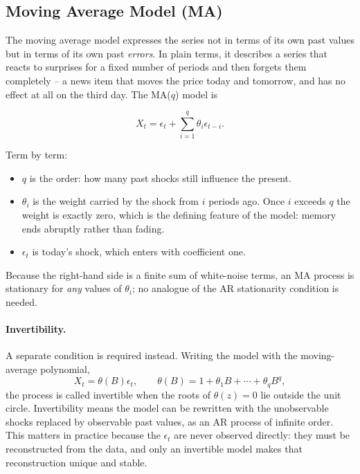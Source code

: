 \documentclass[12pt,a4paper]{article}
\begin{document}
\subsection{Moving Average Model (MA)}

The moving average model expresses the series not in terms of its own past
values but in terms of its own past \emph{errors}. In plain terms, it
describes a series that reacts to surprises for a fixed number of periods and
then forgets them completely -- a news item that moves the price today and
tomorrow, and has no effect at all on the third day. The MA($q$) model is

\begin{equation}
X_t = \epsilon_t + \sum_{i=1}^{q}\theta_i \epsilon_{t-i}.
\end{equation}

Term by term:
\begin{itemize}
\item $q$ is the order: how many past shocks still influence the present.
\item $\theta_i$ is the weight carried by the shock from $i$ periods ago. Once
      $i$ exceeds $q$ the weight is exactly zero, which is the defining
      feature of the model: memory ends abruptly rather than fading.
\item $\epsilon_t$ is today's shock, which enters with coefficient one.
\end{itemize}

Because the right-hand side is a finite sum of white-noise terms, an MA
process is stationary for \emph{any} values of $\theta_i$; no analogue of the
AR stationarity condition is needed.

\paragraph{Invertibility.} A separate condition is required instead. Writing
the model with the moving-average polynomial,
\begin{equation}
X_t = \theta(B)\epsilon_t ,
\qquad
\theta(B) = 1 + \theta_1 B + \cdots + \theta_q B^q ,
\end{equation}
the process is called invertible when the roots of $\theta(z) = 0$ lie outside
the unit circle. Invertibility means the model can be rewritten with the
unobservable shocks replaced by observable past values, as an AR process of
infinite order. This matters in practice because the $\epsilon_t$ are never
observed directly: they must be reconstructed from the data, and only an
invertible model makes that reconstruction unique and stable.
\end{document}
